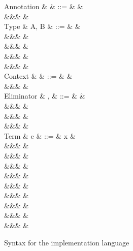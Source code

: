 \begin{figure}
\begin{syntaxfig}
\mbox{Annotation}
&
\alpha
&
::=
&
\top
&
\\
&&&
\bot
&
\\[2mm]
\mbox{Type}
&
A, B
&
::=
&
\tyBool
&
\\
&&&
\tyInt
&
\\
&&&
\tyList
&
\\
&&&
&
\\
&&&
&
\\[2mm]
\mbox{Context}
&
\Gamma
&
::=
&
\cxtEmpty
&
\\
&&&
&
\\[2mm]
\mbox{Eliminator}
&
\sigma, \tau
&
::=
&
&
\\
&&&
&
\\
&&&
&
\\
&&&
&
\\[2mm]
\mbox{Term}
&
e
&
::=
&
x
&
\\
&&&
\annot{\exTrue}{\alpha} \mid \annot{\exFalse}{\alpha}
&
\\
&&&
&
\\
&&&
&
\\
&&&
&
\\
&&&
&
\\
&&&
&
\\
&&&
\annot{\exNil}{\alpha}
&
\\
&&&
&
\\
&&&
&
\end{syntaxfig}
\caption{Syntax for the implementation language}
\label{fig:impl-language:syntax}
\end{figure}
